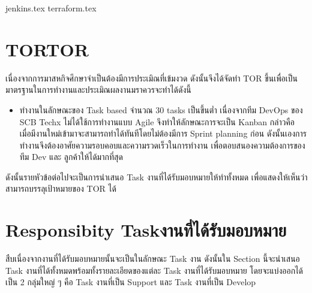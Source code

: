 \clearpage
{jenkins.tex}
\clearpage
{terraform.tex}
\clearpage

\section{\ifenglish TOR\else TOR\fi}เนื่องจากการมาสหกิจศึกษาจำเป็นต้องมีการประเมิณที่เข้มงวด ดังนั้นจึงได้จัดทำ TOR ขึ้นเพื่อเป็นมาตรฐานในการทำงานและประเมิณผลงานมราควรจะทำได้ดังนี้
\begin{itemize}
      \item ทำงานในลักษณะของ Task based จำนวณ 30 tasks เป็นขึ้นต่ำ เนื่องจากทีม DevOps ของ SCB Techx ไม่ได้ใช้การทำงานแบบ Agile จึงทำให้ลักษณะการจะเป็น Kanban กล่าวคือ เมื่อมีงานใหม่เข้ามาจะสามารถทำได้ทันทีโดยไม่ต้องมีการ Sprint planning ก่อน ดังนั้นเองการทำงานจึงต้องอาศัยความรอบคอบและความรวดเร็วในการทำงาน เพื่อตอบสนองความต้องการของทีม Dev และ ลูกค้าให้ได้มากที่สุด
\end{itemize}
ดังนั้นรายหัวข้อต่อไปจะเป็นการนำเสนอ Task งานที่ได้รับมอบหมายให้ทำทั้งหมด เพื่อแสดงให้เห็นว่าสามารถบรรลุเป้าหมายของ TOR ได้

\section{\ifenglish Responsibity Task\else งานที่ได้รับมอบหมาย\fi}
สืบเนื่องจากงานที่ได้รับมอบหมายนั้นจะเป็นในลักษณะ Task งาน ดังนั้นใน Section นี้จะนำเสนอ Task งานที่ได้ทั้งหมดพร้อมทั้งรายละเอียดของแต่ละ Task งานที่ได้รับมอบหมาย โดยจะแบ่งออกได้เป็น 2 กลุ่มใหญ่ ๆ คือ Task งานที่เป็น Support และ Task งานที่เป็น Develop
